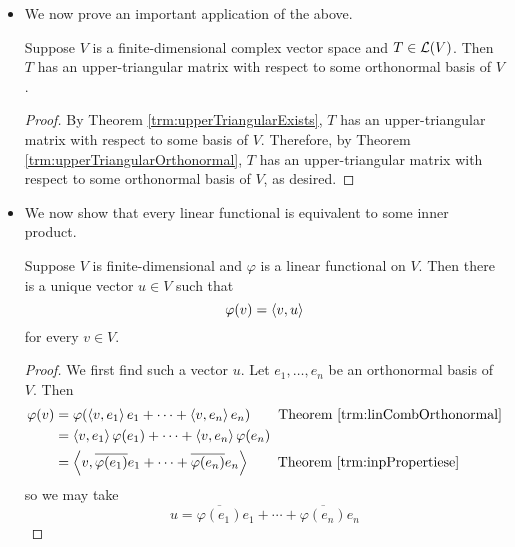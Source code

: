 \documentclass[../main.tex]{subfiles}
\begin{document}
\begin{itemize}
\begin{theorem}
\begin{proof}
        \end{proof}
    \end{theorem}
    \item We now prove an important application of the above.
    \begin{theorem}
        Suppose $V$ is a finite-dimensional complex vector space and $T\in\mathcal{L}(V)$. Then $T$ has an upper-triangular matrix with respect to some orthonormal basis of $V$.
        \begin{proof}
            By Theorem \ref{trm:upperTriangularExists}, $T$ has an upper-triangular matrix with respect to some basis of $V$. Therefore, by Theorem \ref{trm:upperTriangularOrthonormal}, $T$ has an upper-triangular matrix with respect to some orthonormal basis of $V$, as desired.
        \end{proof}
    \end{theorem}
    \item We now show that every linear functional is equivalent to some inner product.
    \begin{theorem}\label{trm:RieszRepresentationTheorem}
        Suppose $V$ is finite-dimensional and $\varphi$ is a linear functional on $V$. Then there is a unique vector $u\in V$ such that
        \begin{equation*}
            \varphi(v) = \left\langle{v},{u}\right\rangle
        \end{equation*}
        for every $v\in V$.
        \begin{proof}
            We first find such a vector $u$. Let $e_1,\dots,e_n$ be an orthonormal basis of $V$. Then
            \begin{align*}
                \varphi(v) &= \varphi(\inp{v}{e_1}e_1+\cdots+\inp{v}{e_n}e_n)\tag*{Theorem \ref{trm:linCombOrthonormal}}\\
                &= \inp{v}{e_1}\varphi(e_1)+\cdots+\inp{v}{e_n}\varphi(e_n)\\
                &= \inp{v}{\overline{\varphi(e_1)}e_1+\cdots+\overline{\varphi(e_n)}e_n}\tag*{Theorem \ref{trm:inpPropertiese}}
            \end{align*}
            so we may take
            \begin{equation*}
                u = \overline{\varphi(e_1)}e_1+\cdots+\overline{\varphi(e_n)}e_n

\end{equation*}
\end{proof}
\end{theorem}
\end{itemize}
\end{document}
